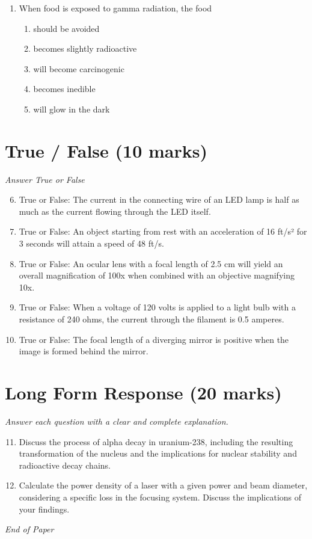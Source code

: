 \documentclass[12pt]{article}
\begin{document}
\begin{enumerate}[label=\arabic*.]
\begin{enumerate}[label=(\alph*)]
    \item 3.5e-08
    \item 4.8e-05
    \item 1.2e-06
    \item 6.3e-04
    \item 8.2e-06
\end{enumerate}
\item When food is exposed to gamma radiation, the food
\begin{enumerate}[label=(\alph*)]
    \item should be avoided
    \item becomes slightly radioactive
    \item will become carcinogenic
    \item becomes inedible
    \item will glow in the dark
\end{enumerate}
\end{enumerate}

\section*{True / False (10 marks)}
\textit{Answer True or False}
\begin{enumerate}[label=\arabic*.]
\setcounter{enumi}{5}
\item True or False: The current in the connecting wire of an LED lamp is half as much as the current flowing through the LED itself.
\item True or False: An object starting from rest with an acceleration of 16 ft/s² for 3 seconds will attain a speed of 48 ft/s.
\item True or False: An ocular lens with a focal length of 2.5 cm will yield an overall magnification of 100x when combined with an objective magnifying 10x.
\item True or False: When a voltage of 120 volts is applied to a light bulb with a resistance of 240 ohms, the current through the filament is 0.5 amperes.
\item True or False: The focal length of a diverging mirror is positive when the image is formed behind the mirror.
\end{enumerate}

\section*{Long Form Response (20 marks)}
\textit{Answer each question with a clear and complete explanation.}
\begin{enumerate}[label=\arabic*.]
\setcounter{enumi}{10}
\item Discuss the process of alpha decay in uranium-238, including the resulting transformation
of the nucleus and the implications for nuclear stability and radioactive decay chains.
\item Calculate the power density of a laser with a given power and beam diameter, considering a
specific loss in the focusing system. Discuss the implications of your findings.
\end{enumerate}

\vfill
\noindent\textit{End of Paper}
\end{document}
